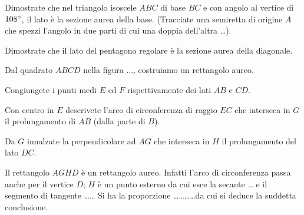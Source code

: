\begin{esercizio}
\label{ese:6.110}
Dimostrate che nel triangolo isoscele $ABC$ di base $BC$ e con angolo al vertice di $108{}^{\circ}$, il lato è la sezione aurea della base. (Tracciate una semiretta di origine $A$ che spezzi l'angolo in due parti di cui una doppia dell'altra \ldots{}).
\end{esercizio}

\begin{esercizio}
\label{ese:6.111}
Dimostrate che il lato del pentagono regolare è la sezione aurea della diagonale.
\end{esercizio}

\begin{esercizio}
\label{ese:6.112}
Dal quadrato $ABCD$ nella figura ..., costruiamo un rettangolo aureo.
\begin{enumerate*}
\item Congiungete i punti medi $E$ ed $F$ rispettivamente dei lati $AB$ e $CD$.
\item Con centro in $E$ descrivete l'arco di circonferenza di raggio $EC$ che interseca in $G$ il prolungamento di $AB$ (dalla parte di $B$).
\item Da $G$ innalzate la perpendicolare ad $AG$ che interseca in $H$ il prolungamento del lato $DC$.
\end{enumerate*}
Il rettangolo $AGHD$ è un rettangolo aureo. Infatti l'arco di circonferenza passa anche per il vertice $D$; $H$ è un punto esterno da cui esce la secante \ldots{} e il segmento di tangente \ldots\ldots{}
Si ha la proporzione \ldots\ldots\ldots\ldots da cui si deduce la suddetta conclusione.
\end{esercizio}
